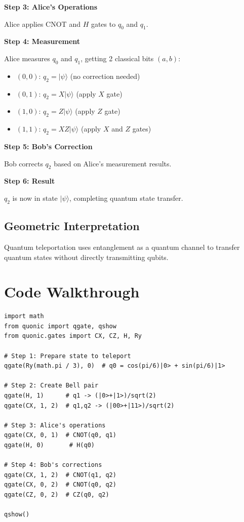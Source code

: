 \documentclass[12pt,a4paper]{article}
\begin{document}
\textbf{Step 3: Alice's Operations}

Alice applies CNOT and $H$ gates to $q_0$ and $q_1$.

\textbf{Step 4: Measurement}

Alice measures $q_0$ and $q_1$, getting 2 classical bits $(a, b)$:
\begin{itemize}
  \item $(0,0)$: $q_2 = |\psi\rangle$ (no correction needed)
  \item $(0,1)$: $q_2 = X|\psi\rangle$ (apply $X$ gate)
  \item $(1,0)$: $q_2 = Z|\psi\rangle$ (apply $Z$ gate)
  \item $(1,1)$: $q_2 = XZ|\psi\rangle$ (apply $X$ and $Z$ gates)
\end{itemize}

\textbf{Step 5: Bob's Correction}

Bob corrects $q_2$ based on Alice's measurement results.

\textbf{Step 6: Result}

$q_2$ is now in state $|\psi\rangle$, completing quantum state transfer.

\subsection{Geometric Interpretation}

Quantum teleportation uses entanglement as a quantum channel to transfer quantum states without directly transmitting qubits.

\section{Code Walkthrough}

\begin{verbatim}
import math
from quonic import qgate, qshow
from quonic.gates import CX, CZ, H, Ry

# Step 1: Prepare state to teleport
qgate(Ry(math.pi / 3), 0)  # q0 = cos(pi/6)|0> + sin(pi/6)|1>

# Step 2: Create Bell pair
qgate(H, 1)      # q1 -> (|0>+|1>)/sqrt(2)
qgate(CX, 1, 2)  # q1,q2 -> (|00>+|11>)/sqrt(2)

# Step 3: Alice's operations
qgate(CX, 0, 1)  # CNOT(q0, q1)
qgate(H, 0)       # H(q0)

# Step 4: Bob's corrections
qgate(CX, 1, 2)  # CNOT(q1, q2)
qgate(CX, 0, 2)  # CNOT(q0, q2)
qgate(CZ, 0, 2)  # CZ(q0, q2)

qshow()
\end{verbatim}
\end{document}
